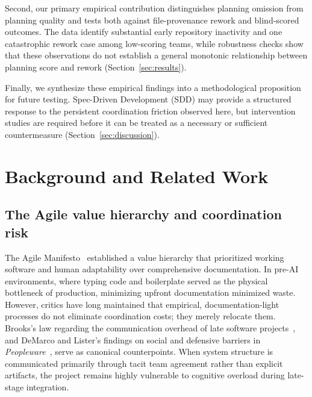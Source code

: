 \documentclass[conference]{IEEEtran}
\begin{document}
Second, our primary empirical contribution distinguishes planning omission
from planning quality and tests both against file-provenance rework and
blind-scored outcomes. The data identify substantial early repository
inactivity and one catastrophic rework case among low-scoring teams, while
robustness checks show that these observations do not establish a general
monotonic relationship between planning score and rework
(Section~\ref{sec:results}).

Finally, we synthesize these empirical findings into a methodological
proposition for future testing. Spec-Driven Development (SDD) may provide a
structured response to the persistent coordination friction observed here,
but intervention studies are required before it can be treated as a necessary
or sufficient countermeasure (Section~\ref{sec:discussion}).

\section{Background and Related Work}

\subsection{The Agile value hierarchy and coordination risk}
The Agile Manifesto~\cite{agile_manifesto_2001} established a value hierarchy that 
prioritized working software and human adaptability over comprehensive documentation. 
In pre-AI environments, where typing code and boilerplate served as the physical 
bottleneck of production, minimizing upfront documentation minimized waste. 
However, critics have long maintained that empirical, documentation-light processes 
do not eliminate coordination costs; they merely relocate them. Brooks's law regarding 
the communication overhead of late software projects~\cite{brooks_1975_mythical_man_month}, and 
DeMarco and Lister's findings on social and defensive barriers in 
\emph{Peopleware}~\cite{demarco_lister_1987_peopleware}, serve as canonical counterpoints. 
When system structure is communicated primarily through tacit team agreement rather 
than explicit artifacts, the project remains highly vulnerable to cognitive overload 
during late-stage integration.
\end{document}
